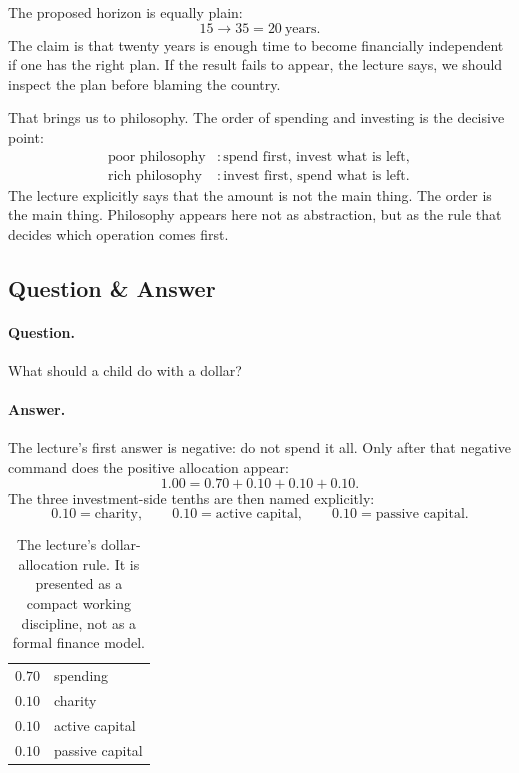 The proposed horizon is equally plain:
\begin{equation}
15 \to 35 = 20\ \text{years}.
\end{equation}
The claim is that twenty years is enough time to become financially independent if one has the right plan. If the result fails to appear, the lecture says, we should inspect the plan before blaming the country.

That brings us to philosophy. The order of spending and investing is the decisive point:
\begin{align}
\text{poor philosophy} &: \text{spend first, invest what is left},\\
\text{rich philosophy} &: \text{invest first, spend what is left}.
\end{align}
The lecture explicitly says that the amount is not the main thing. The order is the main thing. Philosophy appears here not as abstraction, but as the rule that decides which operation comes first.

\subsection{Question \& Answer}

\paragraph{Question.} What should a child do with a dollar?

\paragraph{Answer.} The lecture's first answer is negative: do not spend it all. Only after that negative command does the positive allocation appear:
\begin{equation}
1.00 = 0.70 + 0.10 + 0.10 + 0.10.
\end{equation}
The three investment-side tenths are then named explicitly:
\begin{equation}
0.10 = \text{charity},\qquad
0.10 = \text{active capital},\qquad
0.10 = \text{passive capital}.
\end{equation}

\begin{table}[t]
\centering
\begin{tabular}{ll}
$0.70$ & spending \\
$0.10$ & charity \\
$0.10$ & active capital \\
$0.10$ & passive capital
\end{tabular}
\caption{The lecture's dollar-allocation rule. It is presented as a compact working discipline, not as a formal finance model.}
\end{table}

